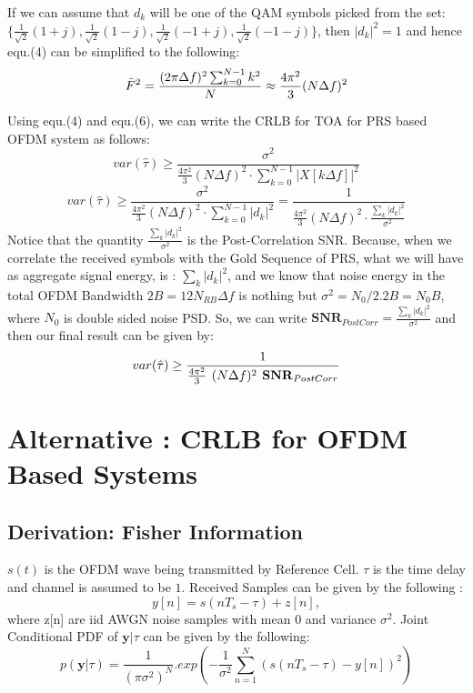 \documentclass{article}
\begin{document}
If we can assume that $d_k$ will be one of the QAM symbols picked from the set: $\{ \frac{1}{\sqrt{2}} (1+j) , \frac{1}{\sqrt{2}} (1-j), \frac{1}{\sqrt{2}} (-1+j), \frac{1}{\sqrt{2}} (-1-j) \}$, then $|d_k|^2 = 1$ and hence equ.(4) can be simplified to the following:
\begin{equation} \label{eq6} \large
\bar{F}^2 = \frac{(2\pi \Delta f)^2 \sum^{N-1}_{k=0}k^2}{N} \approx  \frac{4\pi^2}{3}(N\Delta f)^2
\end{equation}

Using equ.(4) and equ.(6), we can write the CRLB for TOA for PRS based OFDM system as follows:
$$var(\hat{\tau}) \ge \frac{\sigma^2}{\frac{4\pi^2}{3}(N\Delta f)^2 \cdot \sum^{N-1}_{k=0}|X[k\Delta f]|^2}$$ $$ var(\hat{\tau}) \ge \frac{\sigma^2}{\frac{4\pi^2}{3}(N\Delta f)^2 \cdot \sum^{N-1}_{k=0}|d_k|^2} = \frac{1}{\frac{4\pi^2}{3}(N\Delta f)^2 \cdot \frac{\sum_{k}|d_k|^2}{\sigma^2}}$$
Notice that the quantity $\frac{\sum_{k}|d_k|^2}{\sigma^2}$ is the Post-Correlation SNR. Because, when we correlate the received symbols with the Gold Sequence of PRS, what we will have as aggregate signal energy, is : $\sum_{k}|d_k|^2$, and we know that noise energy in the total OFDM Bandwidth $2B = 12N_{RB}\Delta f$ is nothing but $\sigma^2 = N_0/2.2B = N_0B$, where $N_0$ is double sided noise PSD. So, we can write $\mathbf{SNR}_{PostCorr} = \frac{\sum_{k}|d_k|^2}{\sigma^2}$ and then our final result can be given by:
\begin{equation} \label{eq7}
\large
var(\hat{\tau}) \ge \frac{1}{\frac{4\pi^2}{3} \ (N\Delta f)^2 \ \mathbf{SNR}_{PostCorr}} 
\end{equation}

\newpage
\section{Alternative : CRLB for OFDM Based Systems}
\subsection{Derivation: Fisher Information}
$s(t)$ is the OFDM wave being transmitted by Reference Cell. $\tau$ is the time delay and channel is assumed to be $1$. Received Samples can be given by the following :$$y[n] = s(nT_s - \tau) + z[n],$$where z[n] are iid AWGN noise samples with mean $0$ and variance $\sigma^2$.  
Joint Conditional PDF of $\mathbf y|\tau$ can be given by the following:
$$p(\mathbf y|\tau) = \frac{1}{(\pi \sigma^2)^N} .exp(-\frac{1}{\sigma^2}\sum^{N}_{n=1}(s(n T_s - \tau) - y[n])^2)$$
\end{document}
